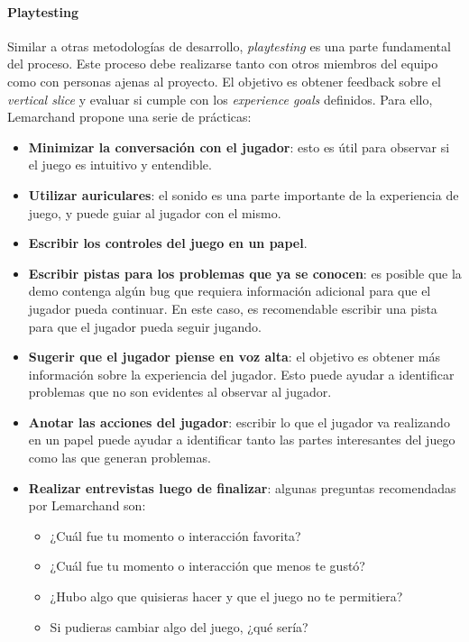 \paragraph{Playtesting}
\par Similar a otras metodologías de desarrollo, \textit{playtesting} es una parte fundamental del proceso. Este proceso debe realizarse tanto con otros miembros del equipo como con personas ajenas al proyecto. El objetivo es obtener feedback sobre el \textit{vertical slice} y evaluar si cumple con los \textit{experience goals} definidos. Para ello, Lemarchand propone una serie de prácticas:
\begin{itemize}
    \item \textbf{Minimizar la conversación con el jugador}: esto es útil para observar si el juego es intuitivo y entendible. 
    \item \textbf{Utilizar auriculares}: el sonido es una parte importante de la experiencia de juego, y puede guiar al jugador con el mismo.
    \item \textbf{Escribir los controles del juego en un papel}.
    \item \textbf{Escribir pistas para los problemas que ya se conocen}: es posible que la demo contenga algún bug  que requiera información adicional para que el jugador pueda continuar. En este caso, es recomendable escribir una pista para que el jugador pueda seguir jugando.
    \item \textbf{Sugerir que el jugador piense en voz alta}: el objetivo es obtener más información sobre la experiencia del jugador. Esto puede ayudar a identificar problemas que no son evidentes al observar al jugador.
    \item \textbf{Anotar las acciones del jugador}: escribir lo que el jugador va realizando en un papel puede ayudar a identificar tanto las partes interesantes del juego como las que generan problemas.
    \item \textbf{Realizar entrevistas luego de finalizar}: algunas preguntas recomendadas por Lemarchand son:
    \begin{itemize}
        \item ¿Cuál fue tu momento o interacción favorita?
        \item ¿Cuál fue tu momento o interacción que menos te gustó?
        \item ¿Hubo algo que quisieras hacer y que el juego no te permitiera? 
        \item Si pudieras cambiar algo del juego, ¿qué sería?
    \end{itemize}
\end{itemize}

